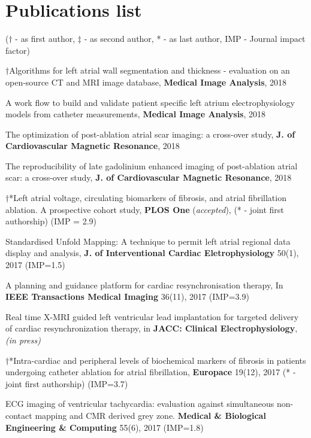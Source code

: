 \documentclass[letterpaper]{twentysecondcv} %
\begin{document}
\newpage
{}
\renewcommand{\theenumi}{J\arabic{enumi}}
\section{Publications list}
($\dagger$ - as first author, $\ddagger$ - as second author, * - as last author, IMP - Journal impact factor)\\[2mm]
\begin{etaremune}
\item $\dagger$Algorithms for left atrial wall segmentation and thickness - evaluation on an open-source CT and MRI image database, \textbf{Medical Image Analysis}, 2018
\item A work flow to build and validate patient specific left atrium electrophysiology models from catheter measurements, \textbf{Medical Image Analysis}, 2018
\item The optimization of post-ablation atrial scar imaging: a cross-over study, \textbf{J. of Cardiovascular Magnetic Resonance}, 2018
\item The reproducibility of late gadolinium enhanced imaging of post-ablation atrial scar: a cross-over study, \textbf{J. of Cardiovascular Magnetic Resonance}, 2018
\item $\dagger$*Left atrial voltage, circulating biomarkers of fibrosis, and atrial fibrillation ablation. A prospective cohort study, \textbf{PLOS One} (\textit{accepted}), (* - joint first authorship) (IMP = 2.9)
\item Standardised Unfold Mapping: A technique to permit left atrial regional data display and analysis, \textbf{J. of Interventional Cardiac Eletrophysiology}  50(1), 2017 (IMP=1.5)
\item A planning and guidance platform for cardiac resynchronisation therapy, In \textbf{IEEE Transactions Medical Imaging} 36(11), 2017 (IMP=3.9)
\item Real time X-MRI guided left ventricular lead implantation for targeted delivery of cardiac resynchronization therapy, in \textbf{JACC: Clinical Electrophysiology}, \textit{(in press)}
\item $\dagger$*Intra-cardiac and peripheral levels of biochemical markers of fibrosis in patients undergoing catheter ablation for atrial fibrillation, \textbf{Europace} 19(12), 2017 (* - joint first authorship) (IMP=3.7)
\item ECG imaging of ventricular tachycardia: evaluation against simultaneous non-contact mapping and CMR derived grey zone. \textbf{Medical \& Biological Engineering \& Computing} 55(6), 2017 (IMP=1.8)

\end{etaremune}
\end{document}
